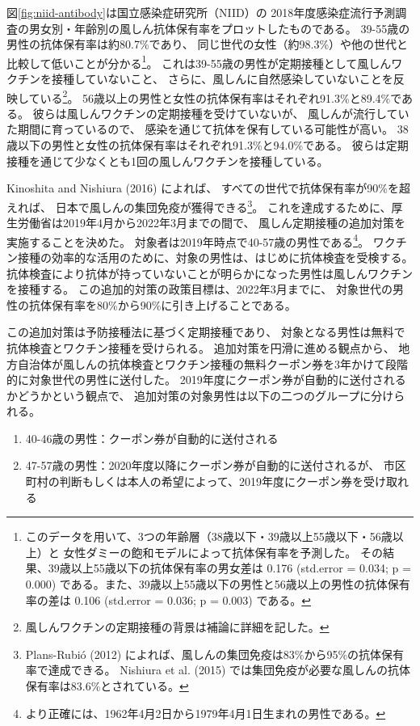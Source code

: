 \documentclass[
  11pt,
  a4paper,
]{article}
\providecommand{\tightlist}{%
  \setlength{\itemsep}{0pt}\setlength{\parskip}{0pt}}
\begin{document}
図\ref{fig:niid-antibody}は国立感染症研究所（NIID）の
2018年度感染症流行予測調査の男女別・年齢別の風しん抗体保有率をプロットしたものである。
39-55歳の男性の抗体保有率は約80.7\%であり、
同じ世代の女性（約98.3\%）や他の世代と比較して低いことが分かる\footnote{このデータを用いて、3つの年齢層（38歳以下・39歳以上55歳以下・56歳以上）と
  女性ダミーの飽和モデルによって抗体保有率を予測した。
  その結果、39歳以上55歳以下の抗体保有率の男女差は
  0.176 (std.error = 0.034; p = 0.000)
  である。また、39歳以上55歳以下の男性と56歳以上の男性の抗体保有率の差は
  0.106 (std.error = 0.036; p = 0.003)
  である。}。
これは39-55歳の男性が定期接種として風しんワクチンを接種していないこと、
さらに、風しんに自然感染していないことを反映している\footnote{風しんワクチンの定期接種の背景は補論に詳細を記した。}。
56歳以上の男性と女性の抗体保有率はそれぞれ91.3\%と89.4\%である。
彼らは風しんワクチンの定期接種を受けていないが、
風しんが流行していた期間に育っているので、
感染を通じて抗体を保有している可能性が高い。
38歳以下の男性と女性の抗体保有率はそれぞれ91.3\%と94.0\%である。
彼らは定期接種を通じて少なくとも1回の風しんワクチンを接種している。

Kinoshita and Nishiura (2016) によれば、
すべての世代で抗体保有率が90\%を超えれば、
日本で風しんの集団免疫が獲得できる\footnote{Plans-Rubió (2012) によれば、風しんの集団免疫は83\%から95\%の抗体保有率で達成できる。
  Nishiura et al. (2015) では集団免疫が必要な風しんの抗体保有率は83.6\%とされている。}。
これを達成するために、厚生労働省は2019年4月から2022年3月までの間で、
風しん定期接種の追加対策を実施することを決めた。
対象者は2019年時点で40-57歳の男性である\footnote{より正確には、1962年4月2日から1979年4月1日生まれの男性である。}。
ワクチン接種の効率的な活用のために、対象の男性は、はじめに抗体検査を受検する。
抗体検査により抗体が持っていないことが明らかになった男性は風しんワクチンを接種する。
この追加的対策の政策目標は、2022年3月までに、
対象世代の男性の抗体保有率を80\%から90\%に引き上げることである。

この追加対策は予防接種法に基づく定期接種であり、
対象となる男性は無料で抗体検査とワクチン接種を受けられる。
追加対策を円滑に進める観点から、
地方自治体が風しんの抗体検査とワクチン接種の無料クーポン券を3年かけて段階的に対象世代の男性に送付した。
2019年度にクーポン券が自動的に送付されるかどうかという観点で、
追加対策の対象男性は以下の二つのグループに分けられる。

\begin{enumerate}
\def\labelenumi{\arabic{enumi}.}
\tightlist
\item
  40-46歳の男性：クーポン券が自動的に送付される
\item
  47-57歳の男性：2020年度以降にクーポン券が自動的に送付されるが、
  市区町村の判断もしくは本人の希望によって、2019年度にクーポン券を受け取れる
\end{enumerate}
\end{document}

